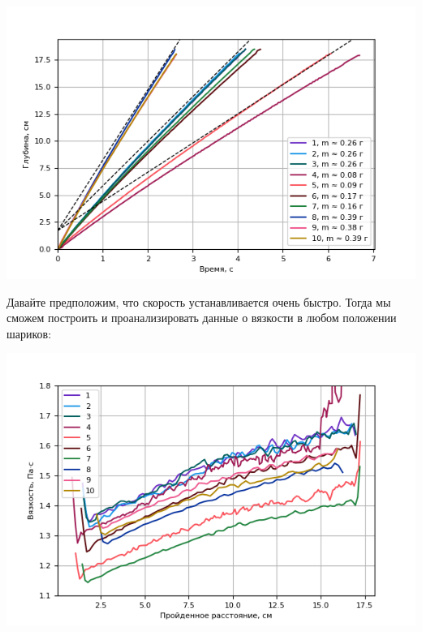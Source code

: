 \documentclass[a4paper, 12pt]{article}
\begin{document}
    \includegraphics{position-time.png}

    Давайте предположим, что скорость устанавливается очень быстро.
    Тогда мы сможем построить и проанализировать данные о вязкости в любом положении шариков:

    \includegraphics{viscosity-position.png}


%
%
\end{document}
